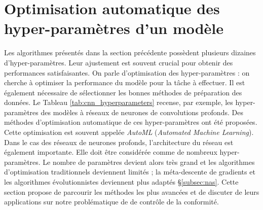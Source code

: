 \smallskip


\section{Optimisation automatique des hyper-paramètres d'un modèle} \label{sec:auto_ml}
Les algorithmes présentés dans la section précédente possèdent plusieurs dizaines d'hyper-paramètres.
Leur ajustement est souvent crucial pour obtenir des performances satisfaisantes.
On parle d'optimisation des hyper-paramètres : on cherche à optimiser la performance du modèle pour la tâche à effectuer.
Il est également nécessaire de sélectionner les bonnes méthodes de préparation des données.
Le Tableau \ref{tab:cnn_hyperparameters} recense, par exemple, les hyper-paramètres des modèles à réseaux de neurones de convolutions profonds.
Des méthodes d'optimisation automatique de ces hyper-paramètres ont été proposées.
Cette optimisation est souvent appelée \textit{AutoML} (\textit{Automated Machine Learning}).
Dans le cas des réseaux de neurones profonds, l'architecture du réseau est également importante.
Elle doit être considérée comme de nombreux hyper-paramètres.
Le nombre de paramètres devient alors très grand et les algorithmes d'optimisation traditionnels deviennent limités ; la méta-descente de gradients et les algorithmes évolutionnistes deviennent plus adaptés §\ref{subsec:nas}.
Cette section propose de parcourir les méthodes les plus avancées et de discuter de leurs applications sur notre problématique de de contrôle de la conformité.

